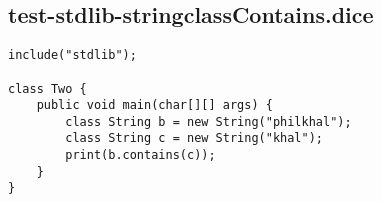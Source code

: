 \subsection{test-stdlib-stringclassContains.dice}
\begin{verbatim}
include("stdlib");

class Two {
	public void main(char[][] args) {
        class String b = new String("philkhal");
        class String c = new String("khal");
        print(b.contains(c));
	}
}

\end{verbatim}